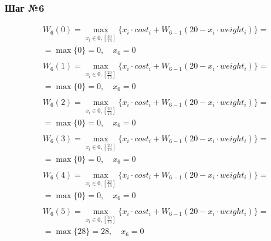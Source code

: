 \documentclass[17pt]{extarticle}
\begin{document}
\subsubsection*{Шаг №6}
\[
    \begin{aligned}
         & W_6(0)=\max_{x_i \in \overline{0, \left[\frac{20}{13}\right]}} \{x_i \cdot cost_i + W_{6-1}(20 - x_i \cdot weight_i)\}= \\& = \max \{
        0\}= 0, \quad x_6 = 0                                                                                                      \\
    \end{aligned}
\]
\[
    \begin{aligned}
         & W_6(1)=\max_{x_i \in \overline{0, \left[\frac{20}{13}\right]}} \{x_i \cdot cost_i + W_{6-1}(20 - x_i \cdot weight_i)\}= \\& = \max \{
        0\}= 0, \quad x_6 = 0                                                                                                      \\
    \end{aligned}
\]
\[
    \begin{aligned}
         & W_6(2)=\max_{x_i \in \overline{0, \left[\frac{20}{13}\right]}} \{x_i \cdot cost_i + W_{6-1}(20 - x_i \cdot weight_i)\}= \\& = \max \{
        0\}= 0, \quad x_6 = 0                                                                                                      \\
    \end{aligned}
\]
\[
    \begin{aligned}
         & W_6(3)=\max_{x_i \in \overline{0, \left[\frac{20}{13}\right]}} \{x_i \cdot cost_i + W_{6-1}(20 - x_i \cdot weight_i)\}= \\& = \max \{
        0\}= 0, \quad x_6 = 0                                                                                                      \\
    \end{aligned}
\]
\[
    \begin{aligned}
         & W_6(4)=\max_{x_i \in \overline{0, \left[\frac{20}{13}\right]}} \{x_i \cdot cost_i + W_{6-1}(20 - x_i \cdot weight_i)\}= \\& = \max \{
        0\}= 0, \quad x_6 = 0                                                                                                      \\
    \end{aligned}
\]
\[
    \begin{aligned}
         & W_6(5)=\max_{x_i \in \overline{0, \left[\frac{20}{13}\right]}} \{x_i \cdot cost_i + W_{6-1}(20 - x_i \cdot weight_i)\}= \\& = \max \{
        28\}= 28, \quad x_6 = 0                                                                                                    \\
    \end{aligned}
\]
\end{document}
